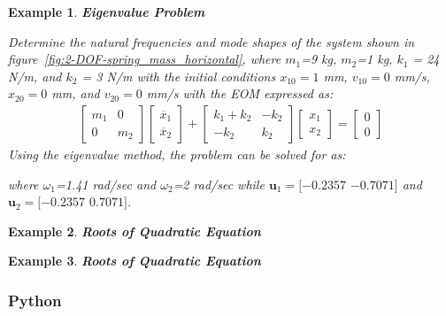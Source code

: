 \documentclass[12pt,letter]{article}
\newtheorem{ex}{Example}
\numberwithin{ex}{section} %
\newenvironment{example}{\begin{mdframed}[middlelinewidth=0.5mm]\begin{ex}\normalfont}{\end{ex}\end{mdframed}}
\numberwithin{re}{section} %
\begin{document}
\begin{example}
\textbf{Eigenvalue Problem}

Determine the natural frequencies and mode shapes of the system shown in figure~\ref{fig:2-DOF-spring_mass_horizontal}, where $m_1$=9 kg, $m_2$=1 kg, $k_1$ = 24 N/m, and $k_2$ = 3 N/m with the initial conditions $x_{10}=1$ mm, $v_{10}=0$ mm/s, $x_{20}=0$ mm, and $v_{20}=0$ mm/s with the EOM expressed as:
\begin{eqnarray}
  \begin{bmatrix} m_1 & 0  \\  0 & m_2 \end{bmatrix}\begin{bmatrix} \ddot{x_1} \\  \ddot{x_2} \end{bmatrix} + \begin{bmatrix} k_1+k_2 & -k_2  \\  -k_2 & k_2 \end{bmatrix}\begin{bmatrix} x_1 \\  x_2 \end{bmatrix} = \begin{bmatrix} 0 \\  0 \end{bmatrix}
\end{eqnarray}
Using the eigenvalue method, the problem can be solved for as:

where $\omega_1$=1.41 rad/sec and  $\omega_2$=2 rad/sec while $\textbf{u}_1 = [-0.2357$ $-0.7071]$ and $\textbf{u}_2 = [-0.2357$ $0.7071]$.

\end{example}


\begin{example}
\textbf{Roots of Quadratic Equation}

\end{example}


\begin{example}
\textbf{Roots of Quadratic Equation}


\end{example}



\subsubsection{Python}
\end{document}
